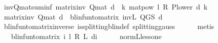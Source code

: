 \begin{isabellebody}
\isamarkupfalse%
\ inv{\isacharunderscore}{\kern0pt}Q{\isacharunderscore}{\kern0pt}mat{\isacharunderscore}{\kern0pt}suminf{\isacharcolon}{\kern0pt}\ {\isachardoublequoteopen}matrix{\isacharunderscore}{\kern0pt}inv\ {\isacharparenleft}{\kern0pt}Q{\isacharunderscore}{\kern0pt}mat\ d{\isacharparenright}{\kern0pt}\ {\isacharequal}{\kern0pt}\ {\isacharparenleft}{\kern0pt}{\isasymSum}k{\isachardot}{\kern0pt}\ {\isacharparenleft}{\kern0pt}matpow\ {\isacharparenleft}{\kern0pt}l\ {\isacharasterisk}{\kern0pt}\isactrlsub R\ {\isacharparenleft}{\kern0pt}P{\isacharunderscore}{\kern0pt}lower\ d{\isacharparenright}{\kern0pt}{\isacharparenright}{\kern0pt}\ k{\isacharparenright}{\kern0pt}{\isacharparenright}{\kern0pt}{\isachardoublequoteclose}\isanewline
%
\isadelimproof
%
\endisadelimproof
%
\isatagproof
{}\isamarkupfalse%
\ {\isacharminus}{\kern0pt}\isanewline
\ \ \isamarkupfalse%
\ {\isachardoublequoteopen}matrix{\isacharunderscore}{\kern0pt}inv\ {\isacharparenleft}{\kern0pt}Q{\isacharunderscore}{\kern0pt}mat\ d{\isacharparenright}{\kern0pt}\ {\isacharequal}{\kern0pt}\ blinfun{\isacharunderscore}{\kern0pt}to{\isacharunderscore}{\kern0pt}matrix\ {\isacharparenleft}{\kern0pt}inv\isactrlsub L\ {\isacharparenleft}{\kern0pt}Q{\isacharunderscore}{\kern0pt}GS\ d{\isacharparenright}{\kern0pt}{\isacharparenright}{\kern0pt}{\isachardoublequoteclose}\isanewline
\ \ \ \ \isamarkupfalse%
\ blinfun{\isacharunderscore}{\kern0pt}to{\isacharunderscore}{\kern0pt}matrix{\isacharunderscore}{\kern0pt}inverse{\isacharparenleft}{\kern0pt}{}{\isacharparenright}{\kern0pt}\ is{\isacharunderscore}{\kern0pt}splitting{\isacharunderscore}{\kern0pt}blin{\isacharunderscore}{\kern0pt}def{\isacharprime}{\kern0pt}\ splitting{\isacharunderscore}{\kern0pt}gauss\isanewline
\ \ \ \ \isamarkupfalse%
\ metis\isanewline
\ \ \isamarkupfalse%
\ \isamarkupfalse%
\ {\isachardoublequoteopen}{\isasymdots}\ {\isacharequal}{\kern0pt}\ blinfun{\isacharunderscore}{\kern0pt}to{\isacharunderscore}{\kern0pt}matrix\ {\isacharparenleft}{\kern0pt}{\isasymSum}i{\isachardot}{\kern0pt}\ {\isacharparenleft}{\kern0pt}l\ {\isacharasterisk}{\kern0pt}\isactrlsub R\ {\isasymP}\isactrlsub L\ d{\isacharparenright}{\kern0pt}{\isacharcircum}{\kern0pt}{\isacharcircum}{\kern0pt}i{\isacharparenright}{\kern0pt}{\isachardoublequoteclose}\isanewline
\ \ \ \ \isamarkupfalse%
\ norm{\isacharunderscore}{\kern0pt}{\isasymP}\isactrlsub L{\isacharunderscore}{\kern0pt}less{\isacharunderscore}{\kern0pt}one\ \isanewline

\end{isabellebody}
